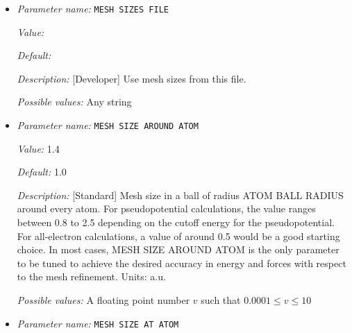 \begin{itemize}
{\it Value:} false


{\it Default:} false


{\it Description:} [Developer] Generates adaptive mesh based on a-posteriori mesh adaption strategy using single atom wavefunctions before computing the ground-state. Default: false.


{\it Possible values:} A boolean value (true or false)
\item {\it Parameter name:} {\tt MESH SIZES FILE}
\label{parameters:Finite element mesh parameters/Auto mesh generation parameters/MESH SIZES FILE}
\label{parameters:Finite_20element_20mesh_20parameters/Auto_20mesh_20generation_20parameters/MESH_20SIZES_20FILE}


{\it Value:} 


{\it Default:} 


{\it Description:} [Developer] Use mesh sizes from this file.


{\it Possible values:} Any string
\item {\it Parameter name:} {\tt MESH SIZE AROUND ATOM}
\label{parameters:Finite element mesh parameters/Auto mesh generation parameters/MESH SIZE AROUND ATOM}
\label{parameters:Finite_20element_20mesh_20parameters/Auto_20mesh_20generation_20parameters/MESH_20SIZE_20AROUND_20ATOM}


{\it Value:} 1.4


{\it Default:} 1.0


{\it Description:} [Standard] Mesh size in a ball of radius ATOM BALL RADIUS around every atom. For pseudopotential calculations, the value ranges between 0.8 to 2.5 depending on the cutoff energy for the pseudopotential. For all-electron calculations, a value of around 0.5 would be a good starting choice. In most cases, MESH SIZE AROUND ATOM is the only parameter to be tuned to achieve the desired accuracy in energy and forces with respect to the mesh refinement. Units: a.u.


{\it Possible values:} A floating point number $v$ such that $0.0001 \leq v \leq 10$
\item {\it Parameter name:} {\tt MESH SIZE AT ATOM}
\label{parameters:Finite element mesh parameters/Auto mesh generation parameters/MESH SIZE AT ATOM}
\label{parameters:Finite_20element_20mesh_20parameters/Auto_20mesh_20generation_20parameters/MESH_20SIZE_20AT_20ATOM}



\end{itemize}

